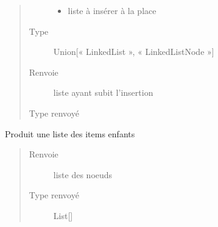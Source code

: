\documentclass[letterpaper,10pt,french]{sphinxmanual}
\begin{document}
\begin{fulllineitems}
\begin{fulllineitems}
\begin{quote}
\begin{description}
\begin{itemize}
\item {} 
 \textendash{} liste à insérer à la place

\end{itemize}

\item[{Type}] \leavevmode
Union{[}« LinkedList », « LinkedListNode »{]}

\item[{Renvoie}] \leavevmode
liste ayant subit l’insertion

\item[{Type renvoyé}] \leavevmode
{\hyperref[\detokenize{linkedlistnode:linkedlistnode.LinkedList}]{}}

\end{description}\end{quote}

\end{fulllineitems}


\begin{fulllineitems}
\label{\detokenize{linkedlistnode:linkedlistnode.LinkedList.toList}}
Produit une liste des items enfants
\begin{quote}\begin{description}
\item[{Renvoie}] \leavevmode
liste des noeuds

\item[{Type renvoyé}] \leavevmode
List{[}{\hyperref[\detokenize{linkedlistnode:linkedlistnode.LinkedListNode}]{}}{]}

\end{description}\end{quote}

\end{fulllineitems}


\end{fulllineitems}

\end{document}
